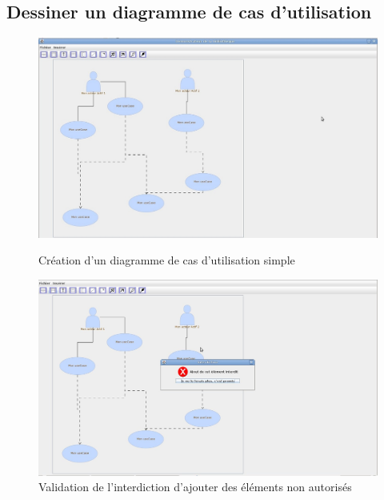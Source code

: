 \documentclass[12pt,a4paper,openany]{report}
\begin{document}
		\subsection{Dessiner un diagramme de cas d'utilisation}
		\begin{figure}[H]
			\centering
			\includegraphics[width=16cm]{validation3.jpg}\\ \vspace{25px} 
			\caption{Création d'un diagramme de cas d'utilisation simple}
			\includegraphics[width=16cm]{validation4.jpg}
			\caption{Validation de l'interdiction d'ajouter des éléments non autorisés}
		\end{figure}
\end{document}
